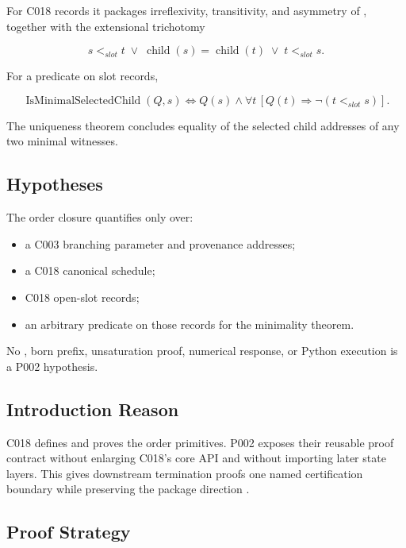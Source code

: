 For C018 \texttt{\protect{}} records it packages irreflexivity,
transitivity, and asymmetry of \texttt{\protect{}}, together with
the extensional trichotomy

\[
 s <_{slot} t
 \;\lor\;
 \operatorname{child}(s)=\operatorname{child}(t)
 \;\lor\;
 t <_{slot} s.
\]

For a predicate \texttt{\protect{}} on slot records,

\[
 \operatorname{IsMinimalSelectedChild}(Q,s)
 \iff Q(s)\land\forall t\,[Q(t)\Rightarrow\neg(t<_{slot}s)].
\]

The uniqueness theorem concludes equality of the selected child
addresses of any two minimal witnesses.

\subsection{Hypotheses}\label{hypotheses-1}

The order closure quantifies only over:

\begin{itemize}
\tightlist
\item
  a C003 branching parameter and provenance addresses;
\item
  a C018 canonical schedule;
\item
  C018 open-slot records;
\item
  an arbitrary predicate on those records for the minimality theorem.
\end{itemize}

No \texttt{\protect{}}, born prefix, unsaturation proof,
numerical response, or Python execution is a P002 hypothesis.

\subsection{Introduction Reason}\label{introduction-reason-6}

C018 defines and proves the order primitives. P002 exposes their
reusable proof contract without enlarging C018's core API and without
importing later state layers. This gives downstream termination proofs
one named certification boundary while preserving the package direction
\texttt{\protect{}}.

\subsection{Proof Strategy}\label{proof-strategy-1}

